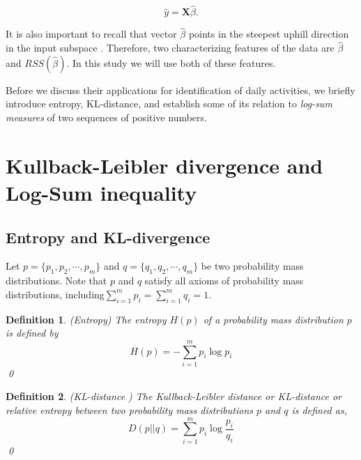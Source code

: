 \documentclass[10pt,myheadings]{IEEEtran}
\newtheorem{definition}{Definition}
\begin{document}
	\begin{equation}
	\label{equ:estimated-y}
	\hat{y} = \boldsymbol{X}\hat{\beta}.
	\end{equation}
	
It is also important to recall that vector $\hat{\beta}$ points in the steepest uphill direction  in the input subspace \cite{Hastie2008}. Therefore, two characterizing features of the data are 
$\hat{\beta}$ and $RSS(\hat{\beta})$. In this study we will use both of these features. 
\par
Before we discuss their applications for identification of daily activities, we briefly introduce entropy, KL-distance, and establish some of its relation to \emph{log-sum measures} of two sequences of positive numbers.

\section{Kullback-Leibler divergence and Log-Sum inequality}
\label{KL-distAndLogSumInequalities}


\subsection{Entropy and KL-divergence}
\label{sec:EntropyAndKLDivergence}
Let $p = \{p_1,p_2,\cdots,p_m\}$ and $q = \{q_1,q_2,\cdots,q_m\}$ be two probability mass distributions. Note that $p$ and $q$ satisfy all axioms of probability mass distributions, including$\sum_{i=1}^m p_i = \sum_{i=1}^m q_i = 1$. 
\par
\begin{definition} (\emph{Entropy}) The \emph{entropy} $H(p)$ of a probability mass distribution $p$ is defined by
\begin{equation}
H(p) = - \sum_{i=1}^m p_i \log p_i
\label{eq:Entropy}
\end{equation}
\qed
\end{definition}
\par
	\begin{definition} (\emph{KL-distance} \cite{Cover2006}) The \emph{Kullback-Leibler distance} or \emph{KL-distance} or
	\emph{relative entropy}	between two probability mass distributions $p$ and $q$ is defined as,
\begin{equation}
D(p||q) = \sum_{i=1}^m p_i \log \frac{p_i}{q_i}
\label{eq:KL-distance}
\end{equation}
	\qed
	\end{definition} 
	
\end{document}

